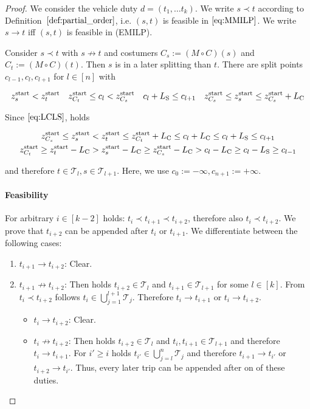 \begin{proof}

We consider the vehicle duty $d=\left(t_1,\dots t_k\right)$. We write $s\prec t$ according to Definition~$\ref{def:partial_order}$, i.e. $(s,t)$ is feasible in $\eqref{eq:MMILP}$. We write $s\to t$ iff $(s,t)$ is feasible in (EMILP).

Consider $s\prec t$ with $s\not\to t$ and costumers $C_s:=(M\circ C)(s)$ and $C_t:=(M\circ C)(t)$. Then $s$ is in a later splitting than $t$. There are split points $c_{l-1},c_l,c_{l+1}$ for $l\in[n]$ with

\begin{align*}
	z^{\operatorname{start}}_s < z^{\operatorname{start}}_t && z^{\operatorname{start}}_{C_t}\leq c_l <z^{\operatorname{start}}_{C_s} && c_l+L_{\operatorname{S}}\leq c_{l+1} && z^{\operatorname{start}}_{C_s}\leq z^{\operatorname{start}}_s\leq z^{\operatorname{start}}_{C_s}+L_{\operatorname{C}}
\end{align*}

Since $\eqref{eq:LCLS}$, holds

\begin{gather*}
	z^{\operatorname{start}}_{C_s} \leq z^{\operatorname{start}}_s < z^{\operatorname{start}}_t\leq z^{\operatorname{start}}_{C_t}+L_{\operatorname{C}} \leq c_l+L_{\operatorname{C}} \leq c_l+L_{\operatorname{S}} \leq c_{l+1} \\
	z^{\operatorname{start}}_{C_t} \geq z^{\operatorname{start}}_t-L_{\operatorname{C}} > z^{\operatorname{start}}_s-L_{\operatorname{C}} \geq z^{\operatorname{start}}_{C_s}-L_{\operatorname{C}} > c_l-L_{\operatorname{C}}\geq c_l-L_{\operatorname{S}}\geq c_{l-1}
\end{gather*}

and therefore $t\in\mathcal{T}_l,s\in\mathcal{T}_{l+1}$. Here, we use $c_{0}:=-\infty,c_{n+1}:=+\infty$.

\paragraph{Feasibility}

For arbitrary $i\in[k-2]$ holds: $t_i\prec t_{i+1}\prec t_{i+2}$, therefore also $t_i\prec t_{i+2}$. We prove that $t_{i+2}$ can be appended after $t_{i}$ or $t_{i+1}$. We differentiate between the following cases:

\begin{enumerate}
	\item{$t_{i+1}\to t_{i+2}$:}
		Clear.
	\item{$t_{i+1}\not\to t_{i+2}$:}
		Then holds $t_{i+2}\in\mathcal{T}_l$ and $t_{i+1}\in\mathcal{T}_{l+1}$ for some $l\in[k]$. From $t_i\prec t_{i+2}$ follows $t_i\in\bigcup_{j=1}^{l+1}\mathcal{T}_j$. Therefore $t_i\to t_{i+1}$ or $t_i\to t_{i+2}$.
	\begin{itemize}
		\item{$t_i\to t_{i+2}$:}
			Clear.
		\item{$t_i\not\to t_{i+2}$:}
			Then holds $t_{i+2}\in\mathcal{T}_l$ and $t_i,t_{i+1}\in\mathcal{T}_{l+1}$ and therefore $t_i\to t_{i+1}$. For $i'\geq i$ holds $t_{i'}\in\bigcup_{j=l}^n \mathcal{T}_j$ and therefore $t_{i+1}\to t_{i'}$ or $t_{i+2}\to t_{i'}$. Thus, every later trip can be appended after on of these duties.
	\end{itemize}
\end{enumerate}


\end{proof}
